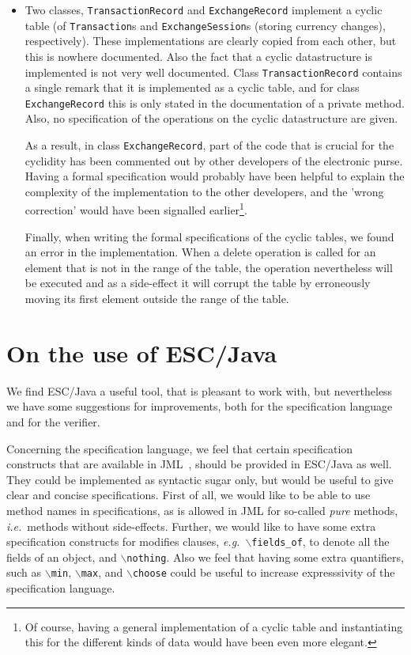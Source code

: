 \documentclass[a4paper]{llncs}
\newcommand{\noth}{\(\backslash\)\texttt{nothing}}
\newcommand{\fieldsof}{\(\backslash\)\texttt{fields\_of}}
\begin{document}
\begin{itemize}
\item Two classes, \texttt{TransactionRecord} and
\texttt{ExchangeRecord} implement a cyclic table (of
\texttt{Transaction}s and
\texttt{ExchangeSession}s (storing currency changes),
respectively).  These implementations are clearly copied from each
other, but this is nowhere documented. Also the fact that a
cyclic datastructure is implemented is not very well documented. Class
\texttt{TransactionRecord} contains a single remark that it is
implemented as a cyclic table, and for class
\texttt{ExchangeRecord} this is only stated in the documentation of a
private method. Also, no specification of the operations on the cyclic
datastructure are given.

As a result, in class \texttt{ExchangeRecord}, part of the code that
is crucial for the cyclidity has been commented out by other
developers of the electronic purse. Having a formal specification
would probably have been helpful to explain the complexity of the
implementation to the other developers, and the 'wrong correction'
would have been signalled earlier\footnote{Of course, having a general 
implementation of a cyclic table and instantiating this for the
different kinds of data would have been even more elegant.}.

Finally, when writing the formal specifications of the cyclic tables,
we found an error in the implementation. When a delete operation is
called for an element that is not in the range of the table, the
operation nevertheless will be executed and as a side-effect it will
corrupt the table by erroneously moving its first element outside the
range of the table.
\end{itemize}


\section{On the use of ESC/Java}
\label{SectESC}
We find ESC/Java a useful tool, that is pleasant to work with, but
nevertheless we have some suggestions for improvements, both for the
specification language and for the verifier.

Concerning the specification language, we feel that certain
specification constructs that are available in JML~\cite{LeavensBR99},
should be provided in ESC/Java as well. They could be implemented as
syntactic sugar only, but would be useful to give clear and concise
specifications.  First of all, we would like to be able to use method
names in specifications, as is allowed in JML for so-called
\emph{pure} methods, \emph{i.e.}~methods without
side-effects. Further, we would like to have some extra specification
constructs for modifies clauses, \emph{e.g.}~\fieldsof, to denote all
the fields of an object, and \noth. Also we feel that having some
extra quantifiers, such as \texttt{\(\backslash\)min},
\texttt{\(\backslash\)max}, and \texttt{\(\backslash\)choose} could be 
useful to increase expresssivity of the specification language.
\end{document}
